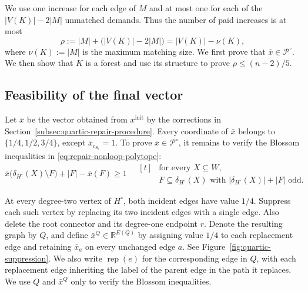\documentclass[11pt]{amsart}
\newcommand{\rep}[1]{\operatorname{rep}(#1)}
\newcommand{\1}{\mathbbm{1}}
\begin{document}
We use one increase for each edge of $M$ and at most one
for each of the $|V(K)|-2|M|$ unmatched demands.
Thus the number of paid increases is at most
\begin{equation}
\label{eq:quartic-repair-number}
 \rho:=|M|+\bigl(|V(K)|-2|M|\bigr)
      =|V(K)|-\nu(K),
\end{equation}
where $\nu(K):=|M|$ is the maximum matching size.
We first prove that $\bar x\in{\mathcal P^\circ}$.
We then show that $K$ is a forest and use its structure
to prove $\rho\le(n-2)/5$.

\subsection{Feasibility of the final vector}
\label{subsec:quartic-feasibility}

Let $\bar x$ be the vector obtained from $x^{\mathrm{init}}$
by the corrections in
Section~\ref{subsec:quartic-repair-procedure}.
Every coordinate of $\bar x$ belongs to $\{1/4,1/2,3/4\}$,
except $\bar x_{c_{S_r}}=1$. To prove
$\bar x\in{\mathcal P^\circ}$, it remains to verify the
Blossom inequalities in
\eqref{eq:repair-nonloop-polytope}:
\begin{equation}
\label{eq:quartic-cut-goal}
 \bar x\bigl(\delta_{H^\circ}(X)\setminus F\bigr)+|F|-\bar x(F)\ge1
 \quad\begin{aligned}[t]
 &\text{for every }X\subseteq W,\\
 &F\subseteq\delta_{H^\circ}(X)
   \text{ with }|\delta_{H^\circ}(X)|+|F|\text{ odd}.
 \end{aligned}
\end{equation}

At every degree-two vertex of $H^\circ$, both incident
edges have value $1/4$. Suppress each such vertex by
replacing its two incident edges with a single edge.
Also delete the root connector and its degree-one endpoint
$r$. Denote the resulting graph by $Q$, and define
$\bar x^Q\in\mathbb R^{E(Q)}$ by assigning value $1/4$ to each
replacement edge and retaining $\bar x_a$ on every unchanged
edge $a$. See Figure~\ref{fig:quartic-suppression}.
We also write $\rep{e}$ for the corresponding edge in $Q$, with
each replacement edge inheriting the label of the parent edge
in the path it replaces.
We use $Q$ and $\bar x^Q$ only to verify the Blossom inequalities.
\end{document}
